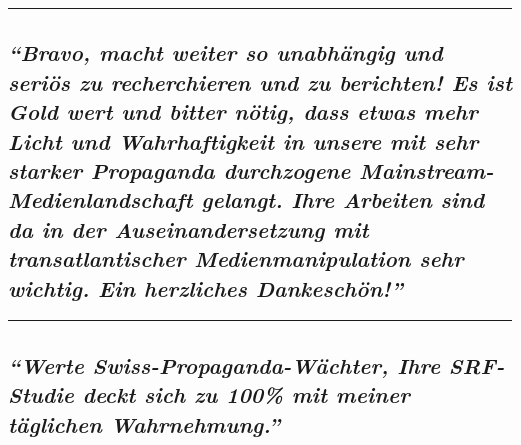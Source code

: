 \begin{center}\rule{0.5\linewidth}{\linethickness}\end{center}

\hypertarget{bravo-macht-weiter-so-unabhuxe4ngig-und-seriuxf6s-zu-recherchieren-und-zu-berichten-es-ist-gold-wert-und-bitter-nuxf6tig-dass-etwas-mehr-licht-und-wahrhaftigkeit-in-unsere-mit-sehr-starker-propaganda-durchzogene-mainstream-medienlandschaft-gelangt-ihre-arbeiten-sind-da-in-der-auseinandersetzung-mit-transatlantischer-medienmanipulation-sehr-wichtig-ein-herzliches-dankeschuxf6n}{%
\subsection{\texorpdfstring{\emph{``Bravo, macht weiter so unabhängig
und seriös zu recherchieren und zu berichten! Es ist Gold wert und
bitter nötig, dass etwas mehr Licht und Wahr­haftig­keit in unsere mit
sehr starker Propaganda durchzogene Main­stream-Medien­land­schaft
gelangt. Ihre Arbeiten sind da in der Aus­ein­ander­setzung mit
transatlantischer Medien­mani­pulation sehr wichtig. Ein herzliches
Dankeschön!''}}{``Bravo, macht weiter so unabhängig und seriös zu recherchieren und zu berichten! Es ist Gold wert und bitter nötig, dass etwas mehr Licht und Wahr­haftig­keit in unsere mit sehr starker Propaganda durchzogene Main­stream-Medien­land­schaft gelangt. Ihre Arbeiten sind da in der Aus­ein­ander­setzung mit transatlantischer Medien­mani­pulation sehr wichtig. Ein herzliches Dankeschön!''}}\label{bravo-macht-weiter-so-unabhuxe4ngig-und-seriuxf6s-zu-recherchieren-und-zu-berichten-es-ist-gold-wert-und-bitter-nuxf6tig-dass-etwas-mehr-licht-und-wahrhaftigkeit-in-unsere-mit-sehr-starker-propaganda-durchzogene-mainstream-medienlandschaft-gelangt-ihre-arbeiten-sind-da-in-der-auseinandersetzung-mit-transatlantischer-medienmanipulation-sehr-wichtig-ein-herzliches-dankeschuxf6n}}

\begin{center}\rule{0.5\linewidth}{\linethickness}\end{center}

\hypertarget{werte-swiss-propaganda-wuxe4chter-ihre-srf-studie-deckt-sich-zu-100-mit-meiner-tuxe4glichen-wahrnehmung}{%
\subsection{\texorpdfstring{\emph{``Werte Swiss-Propaganda-Wächter, Ihre
SRF-Studie deckt sich zu 100\% mit meiner täglichen
Wahrnehmung.''}}{``Werte Swiss-Propaganda-Wächter, Ihre SRF-Studie deckt sich zu 100\% mit meiner täglichen Wahrnehmung.''}}\label{werte-swiss-propaganda-wuxe4chter-ihre-srf-studie-deckt-sich-zu-100-mit-meiner-tuxe4glichen-wahrnehmung}}

